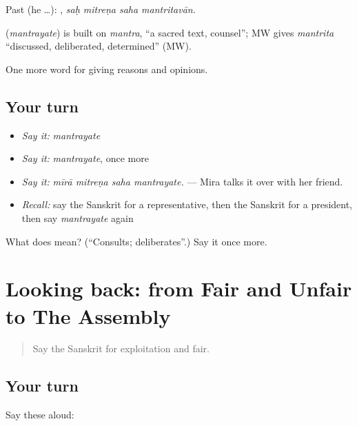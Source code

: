Past (he …):    , \emph{saḥ mitreṇa saha mantritavān}.

\begin{cousinweb}
\textbf{} (\emph{mantrayate}) is built on \emph{mantra}, \textquotedblleft{}a sacred text, counsel\textquotedblright{}; MW gives \emph{mantrita} \textquotedblleft{}discussed, deliberated, determined\textquotedblright{} (MW).
\end{cousinweb}

\begin{grammarlens}[title={What you've built}]
One more word for giving reasons and opinions.
\end{grammarlens}

\subsection*{Your turn}
\begin{itemize}
\raggedright
  \item \emph{Say it:} \emph{mantrayate}
  \item \emph{Say it:} \emph{mantrayate}, once more
  \item \emph{Say it:} \emph{mīrā mitreṇa saha mantrayate.} — Mira talks it over with her friend.
  \item \emph{Recall:} say the Sanskrit for a representative, then the Sanskrit for a president, then say \emph{mantrayate} again
\end{itemize}

\begin{tcolorbox}[breakable,colback=teal!4,colframe=teal!35!black,title={Before you move on}]
What does  mean? (\textquotedblleft{}Consults; deliberates\textquotedblright{}.) Say it once more.
\end{tcolorbox}
\section[(dialogue)]{Looking back: from Fair and Unfair to The Assembly}

\label{lesson:SA-R355-review-348-355}



\begin{quote}
Say the Sanskrit for exploitation and fair.
\end{quote}

\subsection*{Your turn}
Say these aloud:

